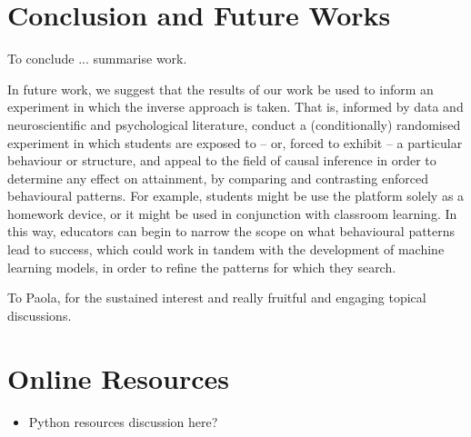 \documentclass[sigplan,screen]{acmart}
\begin{document}
\section{Conclusion and Future Works}\label{sec:conclusion}

{\color{red} To conclude ... summarise work}.

In future work, we suggest that the results of our work be used to inform an experiment in which the inverse approach is taken. That is, informed by data and neuroscientific and psychological literature, conduct a (conditionally) randomised experiment in which students are exposed to -- or, forced to exhibit -- a particular behaviour or structure, and appeal to the field of causal inference in order to determine any effect on attainment, by comparing and contrasting enforced behavioural patterns. For example, students might be use the platform solely as a homework device, or it might be used in conjunction with classroom learning. In this way, educators can begin to narrow the scope on what behavioural patterns lead to success, which could work in tandem with the development of machine learning models, in order to refine the patterns for which they search. 



\begin{acks}
To Paola, for the sustained interest and really fruitful and engaging topical discussions.
\end{acks}





\appendix

\section{Online Resources}

\begin{itemize}
    \item Python resources discussion here?
\end{itemize}
\end{document}
